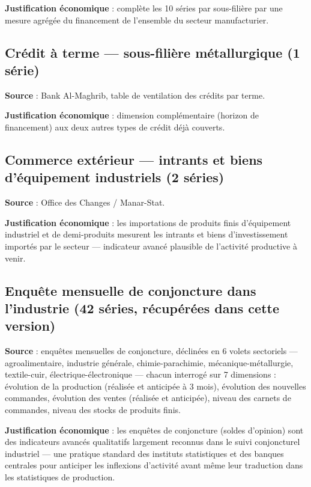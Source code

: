 \documentclass[11pt,a4paper]{article}
\begin{document}
\textbf{Justification économique} : complète les 10 séries par sous-filière par une mesure agrégée du financement de l'ensemble du secteur manufacturier.

\subsection{Crédit à terme --- sous-filière métallurgique (1 série)}

\textbf{Source} : Bank Al-Maghrib, table de ventilation des crédits par terme.

\textbf{Justification économique} : dimension complémentaire (horizon de financement) aux deux autres types de crédit déjà couverts.

\subsection{Commerce extérieur --- intrants et biens d'équipement industriels (2 séries)}

\textbf{Source} : Office des Changes / Manar-Stat.

\textbf{Justification économique} : les importations de produits finis d'équipement industriel et de demi-produits mesurent les intrants et biens d'investissement importés par le secteur --- indicateur avancé plausible de l'activité productive à venir.

\subsection{Enquête mensuelle de conjoncture dans l'industrie (42 séries, récupérées dans cette version)}
\label{sec:conjoncture}

\textbf{Source} : enquêtes mensuelles de conjoncture, déclinées en 6 volets sectoriels --- agroalimentaire, industrie générale, chimie-parachimie, mécanique-métallurgie, textile-cuir, électrique-électronique --- chacun interrogé sur 7 dimensions : évolution de la production (réalisée et anticipée à 3 mois), évolution des nouvelles commandes, évolution des ventes (réalisée et anticipée), niveau des carnets de commandes, niveau des stocks de produits finis.

\textbf{Justification économique} : les enquêtes de conjoncture (soldes d'opinion) sont des indicateurs avancés qualitatifs largement reconnus dans le suivi conjoncturel industriel --- une pratique standard des instituts statistiques et des banques centrales pour anticiper les inflexions d'activité avant même leur traduction dans les statistiques de production.
\end{document}
